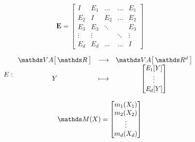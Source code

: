 {    \begin{minipage}{0.33\textwidth}
        \begin{equation}
            \mathbf E =
            \begin{bmatrix}
                I           & \mathit E_1 & \dots  & \dots  & \mathit E_1 \\
                \mathit E_2 & I           & E_2    & \dots  & \mathit E_2 \\
                \mathit E_3 & \mathit E_3 & \ddots &        & \mathit E_3 \\
                \vdots      & \vdots      &        & \ddots & \vdots      \\
                \mathit E_d & \mathit E_d & \dots  & \dots  & I
            \end{bmatrix}
            \label{eq:gam-matrix-E}
        \end{equation}
    \end{minipage}
    \begin{minipage}{0.35\textwidth}
        \begin{equation}
            E : \func{\VA{\grandR}}{\VA{\R d}}{Y}{\begin{bmatrix}
                \mathit E_1[Y] \\
                \vdots \\
                \mathit E_d[Y]
            \end{bmatrix}}
        \end{equation}
    \end{minipage}
    \begin{minipage}{0.25\textwidth}
        \begin{equation}
            \grandM(X) =
            \begin{bmatrix}
                m_1(X_1) \\
                m_2(X_2) \\
                \vdots   \\
                m_d(X_d)
            \end{bmatrix}
        \end{equation}
    \end{minipage}

}
